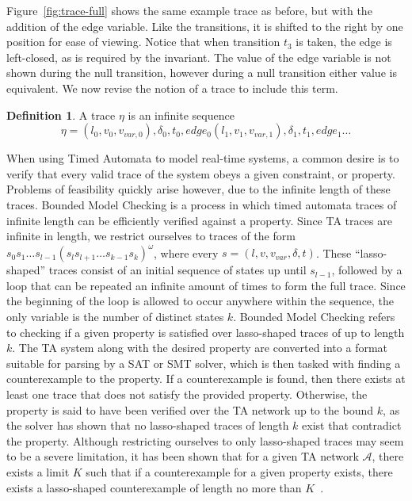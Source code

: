 \documentclass[a4paper,11pt]{report}
\theoremstyle{definition}
\newtheorem{defn}{Definition}[section]
\begin{document}
Figure~\ref{fig:trace-full} shows the same example trace as before, but with the
addition of the edge variable. Like the transitions, it is shifted to the right
by one position for ease of viewing. Notice that when transition $t_{3}$ is
taken, the edge is left-closed, as is required by the invariant. The value of
the edge variable is not shown during the null transition, however during a null
transition either value is equivalent. We now revise the notion of a trace to
include this term.
\begin{defn} A trace $\eta$ is an infinite sequence
  \[\eta = (l_{0},v_{0},v_{var,0}),\delta_{0},t_{0},edge_{0}(l_{1},v_{1},v_{var,1}),\delta_{1},t_{1},edge_{1} \ldots\]
\end{defn}

When using Timed Automata to model real-time systems, a common desire is to
verify that every valid trace of the system obeys a given constraint, or
property. Problems of feasibility quickly arise however, due to the infinite
length of these traces. Bounded Model Checking is a process in which timed
automata traces of infinite length can be efficiently verified against a
property. Since TA traces are infinite in length, we restrict ourselves to
traces of the form
\(s_0 s_1\ldots s_{l-1}{(s_l s_{l+1}\ldots s_{k-1}s_k)}^\omega\), where every
$s = (l,v,v_{var},\delta,t)$. These ``lasso-shaped'' traces consist of an
initial sequence of states up until \(s_{l-1}\), followed by a loop that can be
repeated an infinite amount of times to form the full trace. Since the beginning
of the loop is allowed to occur anywhere within the sequence, the only variable
is the number of distinct states \(k\). Bounded Model Checking refers to
checking if a given property is satisfied over lasso-shaped traces of up to
length \(k\). The TA system along with the desired property are converted into a
format suitable for parsing by a SAT or SMT solver, which is then tasked with
finding a counterexample to the property. If a counterexample is found, then
there exists at least one trace that does not satisfy the provided property.
Otherwise, the property is said to have been verified over the TA network up to
the bound \(k\), as the solver has shown that no lasso-shaped traces of length
\(k\) exist that contradict the property. Although restricting ourselves to only
lasso-shaped traces may seem to be a severe limitation, it has been shown that
for a given TA network $\mathcal{A}$, there exists a limit $K$ such that if a
counterexample for a given property exists, there exists a lasso-shaped
counterexample of length no more than $K$~\cite{biere99}.
\end{document}
